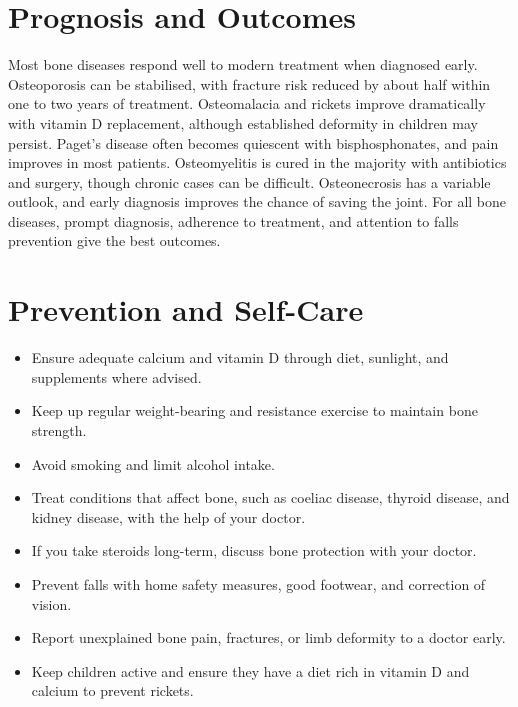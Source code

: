 \section*{Prognosis and Outcomes}
Most bone diseases respond well to modern treatment when diagnosed early. Osteoporosis can be stabilised, with fracture risk reduced by about half within one to two years of treatment. Osteomalacia and rickets improve dramatically with vitamin D replacement, although established deformity in children may persist. Paget's disease often becomes quiescent with bisphosphonates, and pain improves in most patients. Osteomyelitis is cured in the majority with antibiotics and surgery, though chronic cases can be difficult. Osteonecrosis has a variable outlook, and early diagnosis improves the chance of saving the joint. For all bone diseases, prompt diagnosis, adherence to treatment, and attention to falls prevention give the best outcomes.

\section*{Prevention and Self-Care}
\begin{itemize}
    \item Ensure adequate calcium and vitamin D through diet, sunlight, and supplements where advised.
    \item Keep up regular weight-bearing and resistance exercise to maintain bone strength.
    \item Avoid smoking and limit alcohol intake.
    \item Treat conditions that affect bone, such as coeliac disease, thyroid disease, and kidney disease, with the help of your doctor.
    \item If you take steroids long-term, discuss bone protection with your doctor.
    \item Prevent falls with home safety measures, good footwear, and correction of vision.
    \item Report unexplained bone pain, fractures, or limb deformity to a doctor early.
    \item Keep children active and ensure they have a diet rich in vitamin D and calcium to prevent rickets.
\end{itemize}

